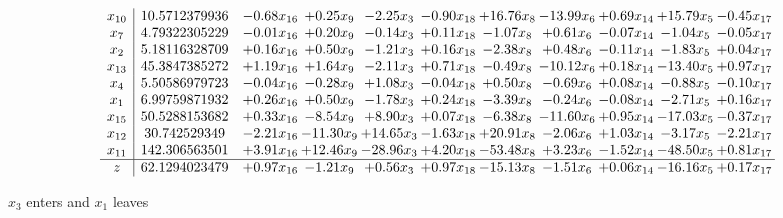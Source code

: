 \documentclass[9pt]{article}
\begin{document}
 \[\begin{array}{c| c c@{\hskip 2pt} c@{\hskip 2pt} c@{\hskip 2pt} c@{\hskip 2pt} c@{\hskip 2pt} c@{\hskip 2pt} c@{\hskip 2pt} c@{\hskip 2pt} c@{\hskip 2pt} }
 x_{10}   &  10.5712379936 & -0.68 x_{16} & +  0.25 x_{9} & -2.25 x_{3} & -0.90 x_{18} & + 16.76 x_{8} & -13.99 x_{6} & +  0.69 x_{14} & + 15.79 x_{5} & -0.45 x_{17}\\
 x_{7}   &  4.79322305229 & -0.01 x_{16} & +  0.20 x_{9} & -0.14 x_{3} & +  0.11 x_{18} & -1.07 x_{8} & +  0.61 x_{6} & -0.07 x_{14} & -1.04 x_{5} & -0.05 x_{17}\\
 x_{2}   &  5.18116328709 & +  0.16 x_{16} & +  0.50 x_{9} & -1.21 x_{3} & +  0.16 x_{18} & -2.38 x_{8} & +  0.48 x_{6} & -0.11 x_{14} & -1.83 x_{5} & +  0.04 x_{17}\\
 x_{13}   &  45.3847385272 & +  1.19 x_{16} & +  1.64 x_{9} & -2.11 x_{3} & +  0.71 x_{18} & -0.49 x_{8} & -10.12 x_{6} & +  0.18 x_{14} & -13.40 x_{5} & +  0.97 x_{17}\\
 x_{4}   &  5.50586979723 & -0.04 x_{16} & -0.28 x_{9} & +  1.08 x_{3} & -0.04 x_{18} & +  0.50 x_{8} & -0.69 x_{6} & +  0.08 x_{14} & -0.88 x_{5} & -0.10 x_{17}\\
 x_{1}   &  6.99759871932 & +  0.26 x_{16} & +  0.50 x_{9} & -1.78 x_{3} & +  0.24 x_{18} & -3.39 x_{8} & -0.24 x_{6} & -0.08 x_{14} & -2.71 x_{5} & +  0.16 x_{17}\\
 x_{15}   &  50.5288153682 & +  0.33 x_{16} & -8.54 x_{9} & +  8.90 x_{3} & +  0.07 x_{18} & -6.38 x_{8} & -11.60 x_{6} & +  0.95 x_{14} & -17.03 x_{5} & -0.37 x_{17}\\
 x_{12}   &  30.742529349 & -2.21 x_{16} & -11.30 x_{9} & + 14.65 x_{3} & -1.63 x_{18} & + 20.91 x_{8} & -2.06 x_{6} & +  1.03 x_{14} & -3.17 x_{5} & -2.21 x_{17}\\
 x_{11}   &  142.306563501 & +  3.91 x_{16} & + 12.46 x_{9} & -28.96 x_{3} & +  4.20 x_{18} & -53.48 x_{8} & +  3.23 x_{6} & -1.52 x_{14} & -48.50 x_{5} & +  0.81 x_{17}\\
\hline
z    &  62.1294023479 & +  0.97 x_{16} & -1.21 x_{9} & +  0.56 x_{3} & +  0.97 x_{18} & -15.13 x_{8} & -1.51 x_{6} & +  0.06 x_{14} & -16.16 x_{5} & +  0.17 x_{17}\\
\end{array}\]


 $ x_{3} $ enters and $ x_{1} $ leaves 
\end{document}

